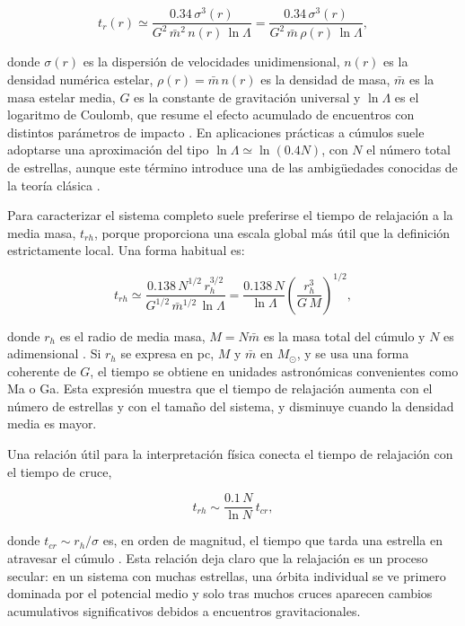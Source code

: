     \begin{equation}
        t_r(r) \simeq \frac{0.34\,\sigma^3(r)}{G^2\,\bar{m}^2\,n(r)\,\ln\Lambda}
        = \frac{0.34\,\sigma^3(r)}{G^2\,\bar{m}\,\rho(r)\,\ln\Lambda},
    \end{equation}
    
    donde $\sigma(r)$ es la dispersión de velocidades unidimensional, $n(r)$ es 
    la densidad numérica estelar, $\rho(r)=\bar{m}\,n(r)$ es la densidad de 
    masa, $\bar{m}$ es la masa estelar media, $G$ es la constante de gravitación 
    universal y $\ln\Lambda$ es el logaritmo de Coulomb, que resume el efecto 
    acumulado de encuentros con distintos parámetros de impacto 
    \cite{BinneyTremaine2008,Spitzer1987}. En aplicaciones prácticas a cúmulos 
    suele adoptarse una aproximación del tipo $\ln\Lambda \simeq \ln(0.4N)$, con 
    $N$ el número total de estrellas, aunque este término introduce una de las 
    ambigüedades conocidas de la teoría clásica \cite{Spitzer1987,Hamilton2018}.

    Para caracterizar el sistema completo suele preferirse el tiempo de 
    relajación a la media masa, $t_{rh}$, porque proporciona una escala global 
    más útil que la definición estrictamente local. Una forma habitual es:
    
    \begin{equation}
        t_{rh} \simeq \frac{0.138\,N^{1/2}\,r_h^{3/2}}{G^{1/2}\,\bar{m}^{1/2}\,
        \ln\Lambda}
        = \frac{0.138\,N}{\ln\Lambda}\left(\frac{r_h^3}{G\,M}\right)^{1/2},
    \end{equation}
    
    donde $r_h$ es el radio de media masa, $M=N\bar{m}$ es la masa total del 
    cúmulo y $N$ es adimensional \cite{Spitzer1987}. Si $r_h$ se expresa en pc, 
    $M$ y $\bar{m}$ en $M_\odot$, y se usa una forma coherente de $G$, el tiempo 
    se obtiene en unidades astronómicas convenientes como Ma o Ga. Esta 
    expresión muestra que el tiempo de relajación aumenta con el número de 
    estrellas y con el tamaño del sistema, y disminuye cuando la densidad media 
    es mayor.

    Una relación útil para la interpretación física conecta el tiempo de 
    relajación con el tiempo de cruce,
    
    \begin{equation}
        t_{rh} \sim \frac{0.1\,N}{\ln N}\,t_{cr},
    \end{equation}

    donde $t_{cr}\sim r_h/\sigma$ es, en orden de magnitud, el tiempo que tarda 
    una estrella en atravesar el cúmulo \cite{BinneyTremaine2008,Spitzer1987}. 
    Esta relación deja claro que la relajación es un proceso secular: en un 
    sistema con muchas estrellas, una órbita individual se ve primero dominada 
    por el potencial medio y solo tras muchos cruces aparecen cambios 
    acumulativos significativos debidos a encuentros gravitacionales.

